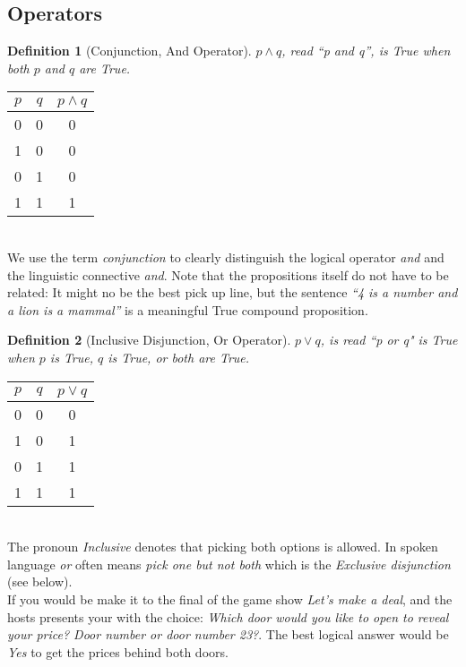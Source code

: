 \documentclass[10pt,a4paper,draft,titlepage,onecolumn]{book}
\newtheorem{definition}{Definition}[subsection]
\begin{document}
\subsection{Operators}
\begin{definition}[Conjunction, And Operator] $p{\wedge}q$, read ``p and q'', is True when both $p$ and $q$ are True.
\end{definition} 
\begin{tabular}{ |c|c|c| }
 \hline
 $p$ & $q$ &  $p{\wedge}q$  \\
 \hline
 0 & 0 & 0 \\
 1 & 0 & 0 \\
 0 & 1 & 0 \\
 1 & 1 & 1 \\
 \hline
\end{tabular}\\
We use the term \textit{conjunction} to clearly distinguish the logical operator \textit{and} and the linguistic connective \textit{and}. Note that the propositions itself do not have to be related: It might no be the best pick up line, but the sentence \textit{``4 is a number and a lion is a mammal''} is a meaningful True compound proposition. \\
\begin{definition}[Inclusive Disjunction, Or Operator]  $p{\vee}q$, is read \textit{``p or q"} is True when $p$ is True, $q$ is True, or both are True. \\\end{definition} 
\begin{tabular}{ |c|c|c| }
 \hline
 $p$ & $q$ &  $p{\vee}q$  \\
 \hline
 0 & 0 & 0 \\
 1 & 0 & 1\\
 0 & 1 & 1\\ 
 1 & 1 & 1\\
 \hline
\end{tabular}\\
The pronoun \textit{Inclusive} denotes that picking both options is allowed.  In spoken language \textit{or} often means \textit{pick one but not both} which is the \textit{Exclusive disjunction} (see below).\\
If you would be make it to the final of the game show \textit{Let's make a deal}, and the hosts presents your with the choice: \textit{Which door would you like to open to reveal your price? Door number  or door number 23?}. The best logical answer would be \textit{Yes} to get the prices behind both doors.
\end{document}
